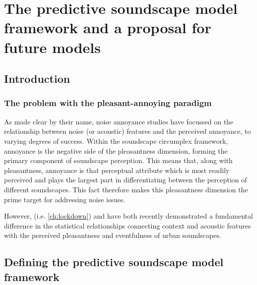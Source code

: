 \chapter{The predictive soundscape model framework and a proposal for future models}
  \label{ch:bayes}

\section{Introduction}
\subsection{The problem with the pleasant-annoying paradigm}

As made clear by their name, noise annoyance studies have focussed on the relationship between noise (or acoustic) features and the perceived annoyance, to varying degrees of success. Within the soundscape circumplex framework, annoyance is the negative side of the pleasantness dimension, forming the  primary component of soundscape perception. This means that, along with pleasantness, annoyance is that perceptual attribute which is most readily perceived and plays the largest part in differentiating between the perception of different soundscapes. This fact therefore makes this pleasantness dimension the prime target for addressing noise issues. 

However, \citet{Mitchell2021Investigating} (i.e. \cref{ch:lockdown}) and \citet{Aumond2022} have both recently demonstrated a fundamental difference in the statistical relationships connecting context and acoustic features with the perceived pleasantness and eventfulness of urban soundscapes. %

\section{Defining the predictive soundscape model framework}

